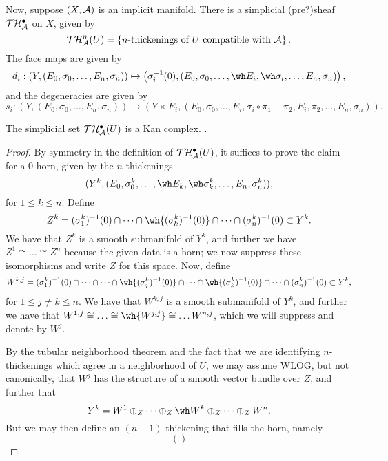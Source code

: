 Now, suppose $(X, \mathcal A)$ is an implicit manifold.  There is a simplicial (pre?)sheaf $\mathcal T \mathcal H_\mathcal A^\bullet$ on $X$, given by
\[ \mathcal T \mathcal H_\mathcal A^n(U) = \left\{ \text{$n$-thickenings of $U$ compatible with $\mathcal A$} \right\}. \]
The face maps are given by
\[ d_i : \left( Y, (E_0, \sigma_0, \dots, E_n, \sigma_n) \right) \mapsto \left( \sigma_i^{-1}(0), (E_0, \sigma_0, \dots, \wh E_i, \wh \sigma_i, \dots , E_n, \sigma_n) \right), \]
and the degeneracies are given by
\[ s_i : \left( Y, (E_0, \sigma_0, \dots, E_n, \sigma_n) \right) \mapsto \left( Y \times E_i, (E_0, \sigma_0, \dots, E_i, \sigma_i \circ \pi_1 - \pi_2, E_i, \pi_2, \dots, E_n, \sigma_n) \right). \]

\begin{prop}\label{kan-complexes}
The simplicial set $\mathcal T \mathcal H_\mathcal A^\bullet(U)$ is a Kan complex. .
\end{prop}

\begin{proof}
By symmetry in the definition of $\mathcal T \mathcal H_\mathcal A^\bullet(U)$, it suffices to prove the claim for a $0$-horn, given by the $n$-thickenings
\[ (Y^k, (E_0, \sigma_0^k, \dots, \wh E_k, \wh \sigma_k^k, \dots, E_n, \sigma_n^k)), \]
for $1 \leq k \leq n$. Define
\[ Z^k = (\sigma_1^k)^{-1}(0) \cap \dots \cap \wh {(\sigma_k^k)^{-1}(0)} \cap \dots \cap (\sigma_n^k)^{-1}(0) \subset Y^k. \]
We have that $Z^k$ is a smooth submanifold of $Y^k$, and further we have $Z^1 \cong \dots \cong Z^n$ because the given data is a horn; we now suppress these isomorphisms and write $Z$ for this space. Now, define
\[ W^{k, j} = (\sigma_1^k)^{-1}(0) \cap \dots \cap \dots \cap \wh {(\sigma_j^k)^{-1}(0)} \cap \dots \cap \wh {(\sigma_k^k)^{-1}(0)} \cap \dots \cap (\sigma_n^k)^{-1}(0) \subset Y^k, \]
for $1 \leq j \neq k \leq n$. We have that $W^{k, j}$ is a smooth submanifold of $Y^k$, and further we have that $W^{1, j} \cong \dots \cong \wh {W^{j, j}} \cong \dots W^{n, j}$, which we will suppress and denote by $W^j$.

By the tubular neighborhood theorem and the fact that we are identifying $n$-thickenings which agree in a neighborhood of $U$, we may assume WLOG, but not canonically, that $W^j$ has the structure of a smooth vector bundle over $Z$, and further that
\[ Y^k = W^1 \oplus_Z \dots \oplus_Z \wh W^k \oplus_Z \dots \oplus_Z W^n. \]
But we may then define an $(n + 1)$-thickening that fills the horn, namely
\[ \left(  \right) \]
\end{proof}


